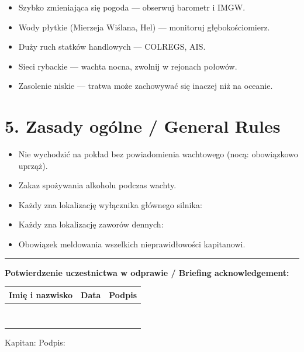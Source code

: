 \documentclass[a4paper,11pt]{article}
\begin{document}
\begin{itemize}[noitemsep]
    \item Szybko zmieniająca się pogoda — obserwuj barometr i IMGW.
    \item Wody płytkie (Mierzeja Wiślana, Hel) — monitoruj głębokościomierz.
    \item Duży ruch statków handlowych — COLREGS, AIS.
    \item Sieci rybackie — wachta nocna, zwolnij w rejonach połowów.
    \item Zasolenie niskie — tratwa może zachowywać się inaczej niż na oceanie.
\end{itemize}

\section*{5. Zasady ogólne / General Rules}

\begin{itemize}[noitemsep]
    \item Nie wychodzić na pokład bez powiadomienia wachtowego (nocą: obowiązkowo uprząż).
    \item Zakaz spożywania alkoholu podczas wachty.
    \item Każdy zna lokalizację wyłącznika głównego silnika: \field{4cm}
    \item Każdy zna lokalizację zaworów dennych: \field{5cm}
    \item Obowiązek meldowania wszelkich nieprawidłowości kapitanowi.
\end{itemize}

\vspace{0.6cm}
\noindent\rule{\linewidth}{0.4pt}
\vspace{0.2cm}

\noindent\textbf{Potwierdzenie uczestnictwa w odprawie / Briefing acknowledgement:}

\vspace{0.3cm}
\begin{tabularx}{\linewidth}{|X|X|c|}
\hline
\textbf{Imię i nazwisko} & \textbf{Data} & \textbf{Podpis} \\
\hline
 & & \\[5pt]\hline
 & & \\[5pt]\hline
 & & \\[5pt]\hline
 & & \\[5pt]\hline
 & & \\[5pt]\hline
 & & \\[5pt]\hline
 & & \\[5pt]\hline
 & & \\[5pt]\hline
\end{tabularx}

\vspace{0.5cm}
\noindent Kapitan: \field{6cm} \hfill Podpis: \field{5cm}
\end{document}
